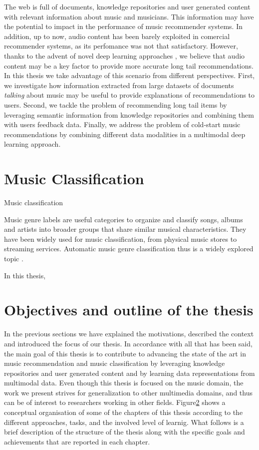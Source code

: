 The web is full of documents, knowledge repositories and user generated content with relevant information about music and musicians. This information may have the potential to impact in the performance of music recommender systems. In addition, up to now, audio content has been barely exploited in comercial recommender systems, as its perfomance was not that satisfactory. However, thanks to the advent of novel deep learning approaches \cite{Oord2013}, we believe that audio content may be a key factor to provide more accurate long tail recommendations.
In this thesis we take advantage of this scenario from different perspectives. First, we investigate how information extracted from large datasets of documents \textit{talking} about music may be useful to provide explanations of recommendations to users. Second, we tackle the problem of recommending long tail items by leveraging semantic information from knowledge repositories and combining them with users feedback data. Finally, we address the problem of cold-start music recommendations by combining different data modalities in a multimodal deep learning approach.%


\section{Music Classification}

Music classification

Music genre labels are useful categories to organize and classify songs, albums and artists into broader groups that share similar musical characteristics. They have been widely used for music classification, from physical music stores to streaming services. Automatic music genre classification thus is a widely explored topic \citep{sturm2012survey}.

In this thesis, 

\section{Objectives and outline of the thesis}

In the previous sections we have explained the motivations, described the context and introduced the focus of our thesis. In accordance with all that has been said, the main goal of this thesis is to contribute to advancing the state of the art in music recommendation and music classification by leveraging knowledge repositories and user generated content and by learning data representations from multimodal data. Even though this thesis is focused on the music domain, the work we present strives for generalization to other multimedia domains, and thus can be of interest to researchers working in other fields. Figure\ref{} shows a conceptual organisation of some of the chapters of this thesis according to the different approaches, tasks, and the involved level of learnig. What follows is a brief description of the structure of the thesis along with the specific goals and achievements that are reported in each chapter.
